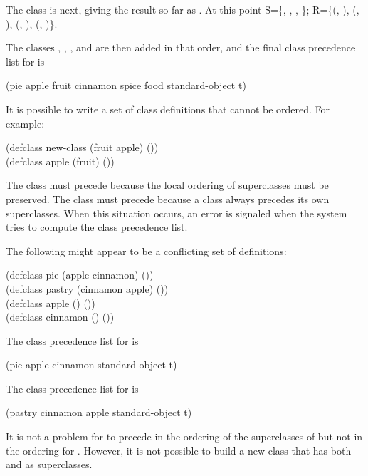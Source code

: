 \begin{flushleft}
The class  is next, giving the result so far as 
.  At this point S=\{,
,
,
\}; R=\{(,
),
(,
),
(,
),
(,
)\}.
\end{flushleft}

The classes , , , and 
 are then added in that order, and the final class precedence list for  is
\begin{lisp}
(pie apple fruit cinnamon spice food standard-object t)
\end{lisp}

It is possible to write a set of class definitions that cannot be 
ordered. For example: 
\begin{lisp}
(defclass new-class (fruit apple) ()) \\
(defclass apple (fruit) ())
\end{lisp}

The class  must precede  because the local
ordering of superclasses must be preserved.  The class  must
precede  because a class always precedes its own
superclasses.  When this situation occurs, an error is signaled when
the system tries to compute the class precedence list.

The following might appear to be a conflicting set of definitions:
\begin{lisp}
(defclass pie (apple cinnamon) ()) \\
(defclass pastry (cinnamon apple) ()) \\
(defclass apple () ()) \\
(defclass cinnamon () ())
\end{lisp}

The class precedence list for  is
\begin{lisp}
(pie apple cinnamon standard-object t)
\end{lisp}

The class precedence list for  is
\begin{lisp}
(pastry cinnamon apple standard-object t)
\end{lisp}

It is not a problem for  to precede  in the
ordering of the superclasses of  but not in the ordering for
.  However, it is not possible to build a new class that
has both  and  as superclasses.

